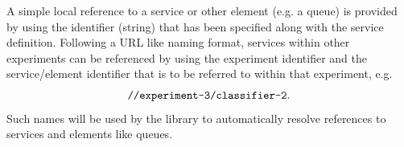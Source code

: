 A simple local reference to a service or other element (e.g. a queue) is 
provided by using the identifier (string) that has been specified along with
the service definition. Following a URL like naming format, services within
other experiments can be referenced by using the experiment identifier and
the service/element identifier that is to be referred to within that experiment,
e.g.
\begin{displaymath}
  \mbox{\ttfamily //experiment-3/classifier-2}.
\end{displaymath}
Such names will be used by the \streams library to automatically resolve references
to services and elements like queues.




%
%




